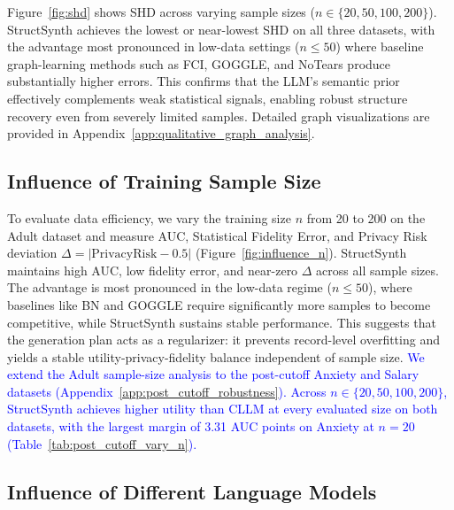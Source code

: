 Figure~\ref{fig:shd} shows SHD across varying sample sizes ($n \in \{20, 50, 100, 200\}$). \textsf{StructSynth} achieves the lowest or near-lowest SHD on all three datasets, with the advantage most pronounced in low-data settings ($n \leq 50$) where baseline graph-learning methods such as FCI, GOGGLE, and NoTears produce substantially higher errors. This confirms that the LLM's semantic prior effectively complements weak statistical signals, enabling robust structure recovery even from severely limited samples. Detailed graph visualizations are provided in Appendix~\ref{app:qualitative_graph_analysis}.


\subsection{Influence of Training Sample Size}

To evaluate data efficiency, we vary the training size $n$ from 20 to 200 on the Adult dataset and measure AUC, Statistical Fidelity Error, and Privacy Risk deviation $\Delta = |\text{PrivacyRisk} - 0.5|$ (Figure~\ref{fig:influence_n}). \textsf{StructSynth} maintains high AUC, low fidelity error, and near-zero $\Delta$ across all sample sizes. The advantage is most pronounced in the low-data regime ($n \leq 50$), where baselines like BN and GOGGLE require significantly more samples to become competitive, while \textsf{StructSynth} sustains stable performance. This suggests that the generation plan acts as a regularizer: it prevents record-level overfitting and yields a stable utility-privacy-fidelity balance independent of sample size.
\textcolor{blue}{We extend the Adult sample-size analysis to the post-cutoff Anxiety and Salary datasets (Appendix~\ref{app:post_cutoff_robustness}). Across $n\in\{20,50,100,200\}$, \textsf{StructSynth} achieves higher utility than CLLM at every evaluated size on both datasets, with the largest margin of 3.31 AUC points on Anxiety at $n=20$ (Table~\ref{tab:post_cutoff_vary_n}).}



\subsection{Influence of Different Language Models}

